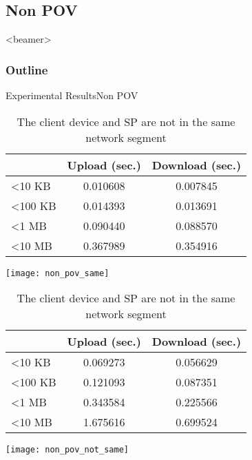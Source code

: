 \subsection{Non POV}
\begin{frame}<beamer>
    \frametitle{Outline}
    \tableofcontents[currentsubsection]
\end{frame}

\begin{frame}{Experimental Results}{Non POV}
	\tiny
    \begin{table}[]
        \centering
        \begin{minipage}[c]{0.5\textwidth}
            \caption{The client device and SP are in the \newline same network segment}
            \begin{tabular}{lcc}
                                 & Upload (sec.) & Download (sec.) \\ \hline
                \textless 10 KB  & 0.010608      & 0.007845        \\ \hline
                \textless 100 KB & 0.014393      & 0.013691        \\ \hline
                \textless 1 MB   & 0.090440      & 0.088570        \\ \hline
                \textless 10 MB  & 0.367989      & 0.354916        \\ \hline
            \end{tabular}
            \begin{center}
                \texttt{[image: non\_pov\_same]}
            \end{center}
        \end{minipage}%
        \begin{minipage}[c]{0.5\textwidth}
            \caption{The client device and SP are \alert{not} in the \newline same network segment}
            \begin{tabular}{lcc}
                                 & Upload (sec.) & Download (sec.) \\ \hline
                \textless 10 KB  & 0.069273      & 0.056629        \\ \hline
                \textless 100 KB & 0.121093      & 0.087351        \\ \hline
                \textless 1 MB   & 0.343584      & 0.225566        \\ \hline
                \textless 10 MB  & 1.675616      & 0.699524        \\ \hline
            \end{tabular}
            \begin{center}
                \texttt{[image: non\_pov\_not\_same]}
            \end{center}
        \end{minipage}
    \end{table}
\end{frame}

